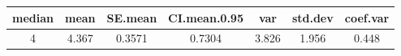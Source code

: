 \documentclass[]{article}
\begin{document}
\begin{longtable}[]{@{}ccccccc@{}}
\toprule
\begin{minipage}[b]{0.10\columnwidth}\centering\strut
median\strut
\end{minipage} & \begin{minipage}[b]{0.09\columnwidth}\centering\strut
mean\strut
\end{minipage} & \begin{minipage}[b]{0.11\columnwidth}\centering\strut
SE.mean\strut
\end{minipage} & \begin{minipage}[b]{0.17\columnwidth}\centering\strut
CI.mean.0.95\strut
\end{minipage} & \begin{minipage}[b]{0.09\columnwidth}\centering\strut
var\strut
\end{minipage} & \begin{minipage}[b]{0.11\columnwidth}\centering\strut
std.dev\strut
\end{minipage} & \begin{minipage}[b]{0.11\columnwidth}\centering\strut
coef.var\strut
\end{minipage}\tabularnewline
\midrule
\endhead
\begin{minipage}[t]{0.10\columnwidth}\centering\strut
4\strut
\end{minipage} & \begin{minipage}[t]{0.09\columnwidth}\centering\strut
4.367\strut
\end{minipage} & \begin{minipage}[t]{0.11\columnwidth}\centering\strut
0.3571\strut
\end{minipage} & \begin{minipage}[t]{0.17\columnwidth}\centering\strut
0.7304\strut
\end{minipage} & \begin{minipage}[t]{0.09\columnwidth}\centering\strut
3.826\strut
\end{minipage} & \begin{minipage}[t]{0.11\columnwidth}\centering\strut
1.956\strut
\end{minipage} & \begin{minipage}[t]{0.11\columnwidth}\centering\strut
0.448\strut
\end{minipage}\tabularnewline
\bottomrule
\end{longtable}
\end{document}
